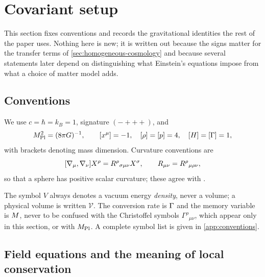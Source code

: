\section{Covariant setup}\label{sec:covariant-setup}

This section fixes conventions and records the gravitational identities the
rest of the paper uses. Nothing here is new; it is written out because the
signs matter for the transfer terms of \cref{sec:homogeneous-cosmology} and
because several statements later depend on distinguishing what Einstein's
equations impose from what a choice of matter model adds.

\subsection{Conventions}\label{sec:conventions}

We use $c=\hbar=k_B=1$, signature $(-+++)$, and
%
\begin{equation}\label{eq:setup-units}
  M_{\mathrm{Pl}}^2=(8\pi G)^{-1},\qquad
  [x^\mu]=-1,\quad [\rho]=[p]=4,\quad [H]=[\Gamma]=1 ,
\end{equation}
%
with brackets denoting mass dimension. Curvature conventions are
%
\begin{equation}\label{eq:setup-curvature}
  [\nabla_\mu,\nabla_\nu]X^\rho=R^\rho{}_{\sigma\mu\nu}X^\sigma,
  \qquad R_{\mu\nu}=R^\rho{}_{\mu\rho\nu},
\end{equation}
%
so that a sphere has positive scalar curvature; these agree with
\textcite{carroll1997_gr-qc9712019}.

The symbol $V$ always denotes a vacuum energy \emph{density}, never a volume; a
physical volume is written $\mathcal V$. The conversion rate is $\Gamma$ and the
memory variable is $M$, never to be confused with the Christoffel symbols
$\Gamma^{\rho}{}_{\mu\nu}$, which appear only in this section, or with $M_{\mathrm{Pl}}$.
A complete symbol list is given in \cref{app:conventions}.

\subsection{Field equations and the meaning of local conservation}
\label{sec:setup-einstein}

